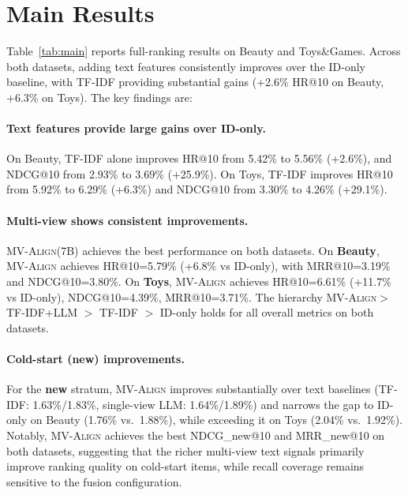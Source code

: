 \documentclass[sigconf,natbib=true,anonymous]{acmart}
\newcommand{\model}{\textsc{MV-Align}\xspace}
\newcommand{\tfidf}{\textsc{TF-IDF}\xspace}
\newcommand{\llm}{\textsc{LLM}\xspace}
\begin{document}
\section{Main Results}
Table~\ref{tab:main} reports full-ranking results on Beauty
and Toys\&Games. Across both datasets, adding text features
consistently improves over the ID-only baseline, with \tfidf
providing substantial gains (+2.6\% HR@10 on Beauty, +6.3\%
on Toys). The key findings are:

\paragraph{Text features provide large gains over ID-only.}
On Beauty, \tfidf alone improves HR@10 from 5.42\% to 5.56\%
(+2.6\%), and NDCG@10 from 2.93\% to 3.69\% (+25.9\%). On
Toys, \tfidf improves HR@10 from 5.92\% to 6.29\% (+6.3\%)
and NDCG@10 from 3.30\% to 4.26\% (+29.1\%).


\paragraph{Multi-view shows consistent improvements.}
\model (7B) achieves the best performance on both datasets.
On \textbf{Beauty}, \model achieves HR@10=5.79\% (+6.8\% vs
ID-only), with MRR@10=3.19\% and NDCG@10=3.80\%. On
\textbf{Toys}, \model achieves HR@10=6.61\% (+11.7\% vs
ID-only), NDCG@10=4.39\%, MRR@10=3.71\%. The hierarchy
\model $>$ TF-IDF+LLM $>$ TF-IDF $>$ ID-only holds for all
overall metrics on both datasets.

\paragraph{Cold-start (new) improvements.}
For the \textbf{new} stratum, \model improves substantially
over text baselines (\tfidf: 1.63\%/1.83\%, single-view \llm:
1.64\%/1.89\%) and narrows the gap to ID-only on Beauty
(1.76\% vs.\ 1.88\%), while exceeding it on Toys (2.04\%
vs.\ 1.92\%). Notably, \model achieves the best NDCG\_new@10
and MRR\_new@10 on both datasets, suggesting that the richer
multi-view text signals primarily improve ranking quality on
cold-start items, while recall coverage remains sensitive to
the fusion configuration.
\end{document}
